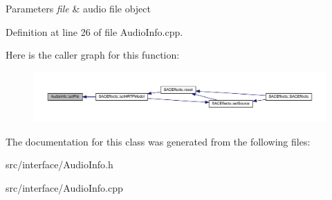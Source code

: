 \begin{DoxyParams}{Parameters}
{\em file} & audio file object \\
\hline
\end{DoxyParams}


Definition at line 26 of file Audio\+Info.\+cpp.

Here is the caller graph for this function\+:
\nopagebreak
\begin{figure}[H]
\begin{center}
\leavevmode
\includegraphics[width=350pt]{class_audio_info_a2d05a12b4191202227e17afc5e57f349_icgraph}
\end{center}
\end{figure}


The documentation for this class was generated from the following files\+:\begin{DoxyCompactItemize}
\item 
src/interface/Audio\+Info.\+h\item 
src/interface/Audio\+Info.\+cpp\end{DoxyCompactItemize}
